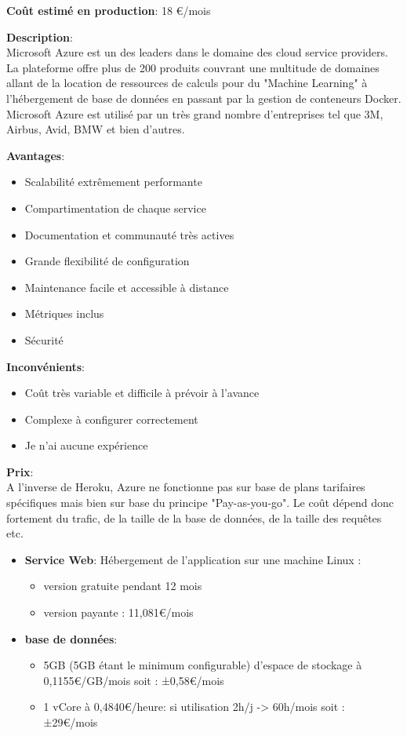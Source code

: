 \newpara
\textbf{Coût estimé en production}: 18 €/mois

\newpage
{}

\textbf{Description}: \\ Microsoft Azure est un des leaders dans le domaine des cloud service providers. La plateforme offre plus de 200 produits couvrant une multitude de domaines allant de la location de ressources de calculs pour du "Machine Learning" à l'hébergement de base de données en passant par la gestion de conteneurs Docker.
\newpara
Microsoft Azure est utilisé par un très grand nombre d'entreprises tel que 3M, Airbus, Avid, BMW et bien d'autres.

\newpara
\textbf{Avantages}:
\begin{itemize}
  \item Scalabilité extrêmement performante
  \item Compartimentation de chaque service
  \item Documentation et communauté très actives
  \item Grande flexibilité de configuration
  \item Maintenance facile et accessible à distance
  \item Métriques inclus
  \item Sécurité
\end{itemize}

\newpara
\textbf{Inconvénients}:
\begin{itemize}
  \item Coût très variable et difficile à prévoir à l'avance
  \item Complexe à configurer correctement
  \item Je n'ai aucune expérience
\end{itemize}

\newpara
\textbf{Prix}: \\ A l'inverse de Heroku, Azure ne fonctionne pas sur base de plans tarifaires spécifiques mais bien sur base du principe "Pay-as-you-go". Le coût dépend donc fortement du trafic, de la taille de la base de données, de la taille des requêtes etc.

\begin{itemize}
  \item \textbf{Service Web}: Hébergement de l'application sur une machine Linux :
  \begin{itemize}
    \item version gratuite pendant 12 mois
    \item version payante : 11,081€/mois
  \end{itemize}
  \item \textbf{base de données}:
  \begin{itemize}
    \item 5GB (5GB étant le minimum configurable) d'espace de stockage à 0,1155€/GB/mois soit : ±0,58€/mois
    \item 1 vCore à 0,4840€/heure: si utilisation 2h/j -> 60h/mois soit : ±29€/mois
  \end{itemize}
\end{itemize}

